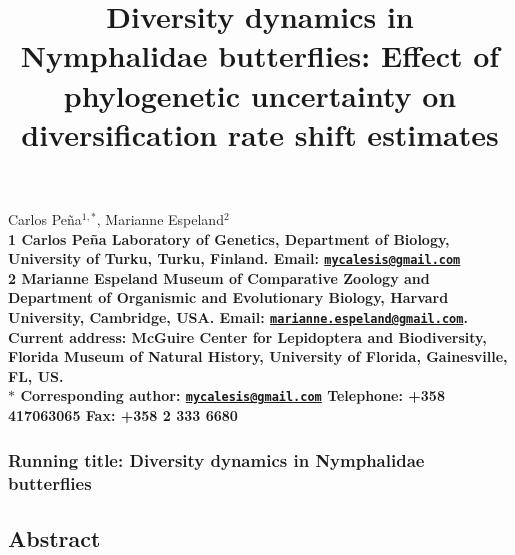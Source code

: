 \documentclass[10pt]{article}
\date{}
\begin{document}
\begin{flushleft}
{\Large
    \title{Diversity dynamics in Nymphalidae butterflies: Effect of phylogenetic uncertainty on diversification rate shift estimates}
}
\maketitle
Carlos Pe\~na$^{1,\ast}$,
Marianne Espeland$^{2}$
\\
\bf{1} Carlos Pe\~na Laboratory of Genetics, Department of Biology, University of Turku, Turku, Finland. Email: \href{mailto:mycalesis@gmail.com}{\nolinkurl{mycalesis@gmail.com}}
\\
\bf{2} Marianne Espeland Museum of Comparative Zoology and Department
of Organismic and Evolutionary Biology, Harvard University, Cambridge,
USA. Email:
\href{mailto:marianne.espeland@gmail.com}{\nolinkurl{marianne.espeland@gmail.com}}.
Current address: McGuire Center for Lepidoptera and Biodiversity,
Florida Museum of Natural History, University of Florida, Gainesville,
FL, US.
\\
$\ast$ \textbf{Corresponding author:}
\href{mailto:mycalesis@gmail.com}{\nolinkurl{mycalesis@gmail.com}}
Telephone: +358 417063065 Fax: +358 2 333 6680

\end{flushleft}




\subsubsection*{Running title: Diversity dynamics in Nymphalidae
butterflies}


\subsection*{Abstract}
\end{document}
